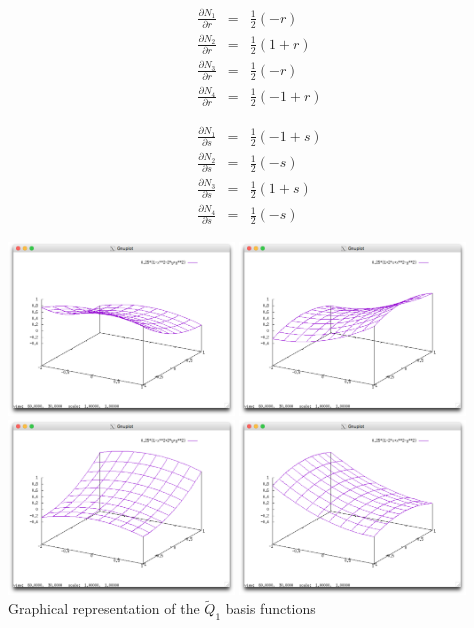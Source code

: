 \begin{eqnarray}
\frac{\partial N_1}{\partial r} &=& \frac{1}{2}(-r)\\
\frac{\partial N_2}{\partial r} &=& \frac{1}{2}(1+r)\\
\frac{\partial N_3}{\partial r} &=& \frac{1}{2}(-r)\\
\frac{\partial N_4}{\partial r} &=& \frac{1}{2}(-1+r)
\end{eqnarray}

\begin{eqnarray}
\frac{\partial N_1}{\partial s} &=& \frac{1}{2}(-1+s)\\
\frac{\partial N_2}{\partial s} &=& \frac{1}{2}(-s)\\
\frac{\partial N_3}{\partial s} &=& \frac{1}{2}(1+s)\\
\frac{\partial N_4}{\partial s} &=& \frac{1}{2}(-s)
\end{eqnarray}

\begin{center}
\includegraphics[width=6cm]{images/rannacherturek/N1}
\includegraphics[width=6cm]{images/rannacherturek/N2}\\
\includegraphics[width=6cm]{images/rannacherturek/N3}
\includegraphics[width=6cm]{images/rannacherturek/N4}\\
{\captionfont Graphical representation of the $\tilde{Q}_1$ basis functions}
\end{center}


